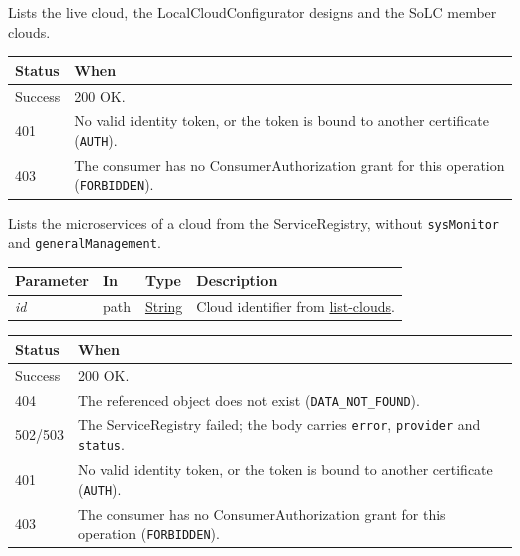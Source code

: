 \documentclass[a4paper]{arrowhead}
\newcommand{\fparam}[1]{\textit{\textcolor{ArrowheadBlue}{#1}}}
\newcommand{\oref}[1]{{\textcolor{ArrowheadBlue}{\hyperref[sec:operations:#1]{#1}}}}
\newcommand{\pref}[1]{{\textcolor{ArrowheadGrey}{\hyperref[sec:model:primitives:#1]{#1}}}}
\begin{document}
Lists the live cloud, the LocalCloudConfigurator designs and the SoLC member clouds.

{\small
\begin{longtable}{|p{2.0cm}|p{13.8cm}|}

\hline
\rowcolor{gray!33} Status & When \\ \hline
\endhead
Success & 200 OK. \\ \hline
401 & No valid identity token, or the token is bound to another certificate (\texttt{AUTH}). \\ \hline
403 & The consumer has no ConsumerAuthorization grant for this operation (\texttt{FORBIDDEN}). \\ \hline
\end{longtable}
}

Lists the microservices of a cloud from the ServiceRegistry, without \texttt{sysMonitor} and \texttt{general\allowbreak{}Management}.

{\small
\begin{longtable}{|p{3.0cm}|p{1.4cm}|p{3.2cm}|p{8.2cm}|}

\hline
\rowcolor{gray!33} Parameter & In & Type & Description \\ \hline
\endhead
\fparam{id} & path & \pref{String} & Cloud identifier from \oref{list-clouds}. \\ \hline
\end{longtable}
}


{\small
\begin{longtable}{|p{2.0cm}|p{13.8cm}|}

\hline
\rowcolor{gray!33} Status & When \\ \hline
\endhead
Success & 200 OK. \\ \hline
404 & The referenced object does not exist (\texttt{DATA\_\allowbreak{}NOT\_\allowbreak{}FOUND}). \\ \hline
502/503 & The ServiceRegistry failed; the body carries \texttt{error}, \texttt{provider} and \texttt{status}. \\ \hline
401 & No valid identity token, or the token is bound to another certificate (\texttt{AUTH}). \\ \hline
403 & The consumer has no ConsumerAuthorization grant for this operation (\texttt{FORBIDDEN}). \\ \hline
\end{longtable}
}
\end{document}
